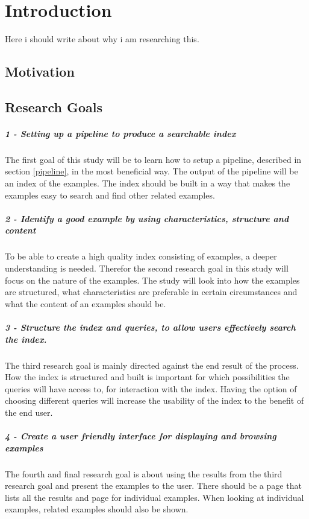 
\chapter{Introduction}

Here i should write about why i am researching this.

\section{Motivation}

\section{Research Goals}

\paragraph{1 - Setting up a pipeline to produce a searchable index}
The first goal of this study will be to learn how to setup a pipeline, described in section \ref{pipeline}, in the most beneficial way. The output of the pipeline will be an index of the examples. The index should be built in a way that makes the examples easy to search and find other related examples.

\paragraph{2 - Identify a good example by using characteristics, structure and content}
To be able to create a high quality index consisting of examples, a deeper understanding is needed. Therefor the second research goal in this study will focus on the nature of the examples. The study will look into how the examples are structured, what characteristics are preferable in certain circumstances and what the content of an examples should be. 

\paragraph{3 - Structure the index and queries, to allow users effectively search the index.}
The third research goal is mainly directed against the end result of the process. How the index is structured and built is important for which possibilities the queries will have access to, for interaction with the index. Having the option of choosing different queries will increase the usability of the index to the benefit of the end user. 

\paragraph{4 - Create a user friendly interface for displaying and browsing examples}
The fourth and final research goal is about using the results from the third research goal and present the examples to the user. There should be a page that lists all the results and page for individual examples. When looking at individual examples, related examples should also be shown.


\cleardoublepage